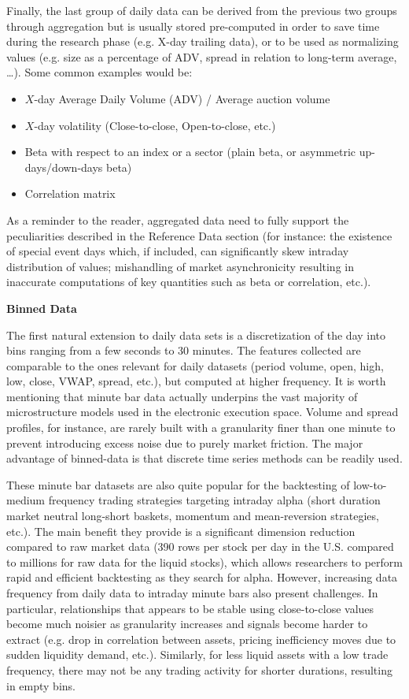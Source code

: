 Finally, the last group of daily data can be derived from the previous two groups through aggregation but is usually stored pre-computed in order to save time during the research phase (e.g. X-day trailing data), or to be used as normalizing values (e.g. size as a percentage of ADV, spread in relation to long-term average, \dots). Some common examples would be:
        \begin{itemize}
        \item $X$-day Average Daily Volume (ADV) / Average auction volume
        \item $X$-day volatility (Close-to-close, Open-to-close, etc.)
        \item Beta with respect to an index or a sector (plain beta, or asymmetric up-days/down-days beta)
        \item Correlation matrix
        \end{itemize}

As a reminder to the reader, aggregated data need to fully support the peculiarities described in the Reference Data section (for instance: the existence of special event days which, if included, can significantly skew intraday distribution of values; mishandling of market asynchronicity resulting in inaccurate computations of key quantities such as beta or correlation, etc.).\twomedskip


\noindent\textbf{Binned Data}\twomedskip

The first natural extension to daily data sets is a discretization of the day into bins ranging from a few seconds to 30 minutes. The features collected are comparable to the ones relevant for daily datasets (period volume, open, high, low, close, VWAP, spread, etc.), but computed at higher frequency. It is worth mentioning that minute bar data actually underpins the vast majority of microstructure models used in the electronic execution space. Volume and spread profiles, for instance, are rarely built with a granularity finer than one minute to prevent introducing excess noise due to purely market friction. The major advantage of binned-data is that discrete time series methods can be readily used.


These minute bar datasets are also quite popular for the backtesting of low-to-medium frequency trading strategies targeting intraday alpha (short duration market neutral long-short baskets, momentum and mean-reversion strategies, etc.). The main benefit they provide is a significant dimension reduction compared to raw market data (390 rows per stock per day in the U.S. compared to millions for raw data for the liquid stocks), which allows researchers to perform rapid and efficient backtesting as they search for alpha. However, increasing data frequency from daily data to intraday minute bars also present challenges. In particular, relationships that appears to be stable using close-to-close values become much noisier as granularity increases and signals become harder to extract (e.g. drop in correlation between assets, pricing inefficiency moves due to sudden liquidity demand, etc.). Similarly, for less liquid assets with a low trade frequency, there may not be any trading activity for shorter durations, resulting in empty bins.


